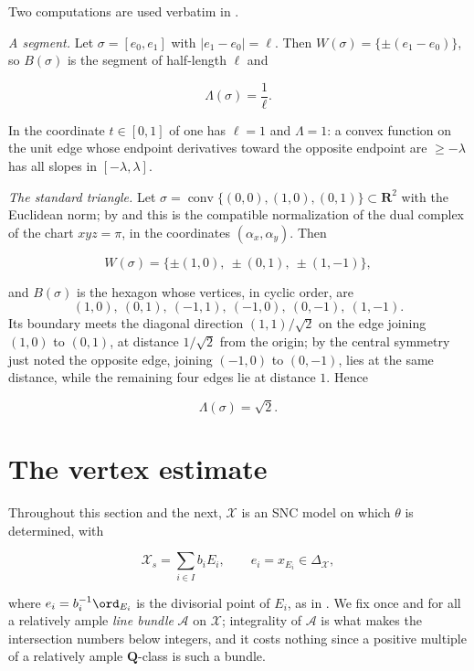 \begin{example}
\label{ex:ch22-gauge-computed}
Two computations are used verbatim in
.

\emph{A segment.}  Let $\sigma=[e_0,e_1]$ with
$|e_1-e_0|=\ell$.  Then $W(\sigma)=\{\pm(e_1-e_0)\}$, so
$B(\sigma)$ is the segment of half-length $\ell$ and

\[
 \Lambda(\sigma)=\frac1\ell .
\tag{22.18}\label{eq:ch22-gauge-segment}
\]

In the coordinate $t\in[0,1]$ of  one has
$\ell=1$ and $\Lambda=1$: a convex function on the unit edge whose
endpoint derivatives toward the opposite endpoint are $\geq-\lambda$ has
all slopes in $[-\lambda,\lambda]$.

\emph{The standard triangle.}  Let
$\sigma=\operatorname{conv}\{(0,0),(1,0),(0,1)\}\subset\mathbf R^2$ with
the Euclidean norm; by  and
 this is the compatible normalization of the
dual complex of the chart $xyz=\pi$, in the coordinates
$(\alpha_x,\alpha_y)$.  Then

\[
 W(\sigma)=\{\pm(1,0),\ \pm(0,1),\ \pm(1,-1)\},
\]

and $B(\sigma)$ is the hexagon whose vertices, in cyclic order, are
\[
 (1,0),\ (0,1),\ (-1,1),\ (-1,0),\ (0,-1),\ (1,-1).
\]
Its boundary meets the
diagonal direction $(1,1)/\sqrt2$ on the edge joining $(1,0)$ to
$(0,1)$, at distance $1/\sqrt2$ from the origin; by the central symmetry
just noted the opposite edge, joining $(-1,0)$ to $(0,-1)$, lies at the
same distance, while the remaining four edges lie at distance $1$.  Hence

\[
 \Lambda(\sigma)=\sqrt2 .
\tag{22.19}\label{eq:ch22-gauge-triangle}
\]
\end{example}

\section{The vertex estimate}
\label{sec:ch22-vertex}

Throughout this section and the next, $\mathcal X$ is an SNC model on which
$\theta$ is determined, with

\[
            \mathcal X_s=\sum_{i\in I}b_iE_i,
            \qquad e_i=x_{E_i}\in\Delta_{\mathcal X},
\tag{22.20}\label{eq:ch22-vertices}
\]

where $e_i=b_i^{-1}\ord_{E_i}$ is the divisorial point of $E_i$, as in
.  We fix once and for all a relatively
ample \emph{line bundle} $\mathcal A$ on $\mathcal X$; integrality of
$\mathcal A$ is what makes the intersection numbers below integers, and it
costs nothing since a positive multiple of a relatively ample
$\mathbf Q$-class is such a bundle.

